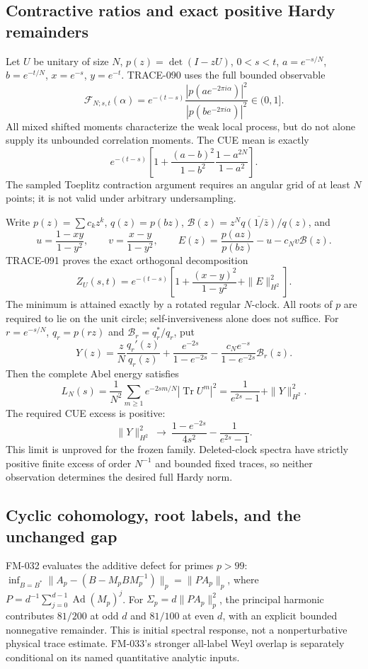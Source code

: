 \subsection{Contractive ratios and exact positive Hardy remainders}
Let $U$ be unitary of size $N$, $p(z)=\det(I-zU)$, $0<s<t$,
$a=e^{-s/N}$, $b=e^{-t/N}$, $x=e^{-s}$, $y=e^{-t}$.
TRACE-090 uses the full bounded observable
\[
 \mathcal F_{N;s,t}(\alpha)=e^{-(t-s)}
 \frac{|p(ae^{-2\pi i\alpha})|^2}{|p(be^{-2\pi i\alpha})|^2}
 \in(0,1].
\]
All mixed shifted moments characterize the weak local process, but do not
alone supply its unbounded correlation moments. The CUE mean is exactly
\[
 e^{-(t-s)}\left[1+\frac{(a-b)^2}{1-b^2}
                         \frac{1-a^{2N}}{1-a^2}\right].
\]
The sampled Toeplitz contraction argument requires an angular grid of
at least $N$ points; it is not valid under arbitrary undersampling.

Write $p(z)=\sum c_kz^k$, $q(z)=p(bz)$,
$\mathscr B(z)=z^N\overline{q(1/\bar z)}/q(z)$, and
\[
 u=\frac{1-xy}{1-y^2},\qquad v=\frac{x-y}{1-y^2},\qquad
 E(z)=\frac{p(az)}{p(bz)}-u-c_Nv\mathscr B(z).
\]
TRACE-091 proves the exact orthogonal decomposition
\[
 Z_U(s,t)=e^{-(t-s)}\left[1+\frac{(x-y)^2}{1-y^2}
                                      +\|E\|_{H^2}^2\right].
\]
The minimum is attained exactly by a rotated regular $N$-clock. All roots
of $p$ are required to lie on the unit circle; self-inversiveness alone
does not suffice. For $r=e^{-s/N}$, $q_r=p(rz)$ and
$\mathscr B_r=q_r^*/q_r$, put
\[
 Y(z)=\frac zN\frac{q_r'(z)}{q_r(z)}
       +\frac{e^{-2s}}{1-e^{-2s}}
       -\frac{c_Ne^{-s}}{1-e^{-2s}}\mathscr B_r(z).
\]
Then the complete Abel energy satisfies
\[
 L_N(s)=\frac1{N^2}\sum_{m\ge1}e^{-2sm/N}
                  |\operatorname{Tr}U^m|^2
       =\frac1{e^{2s}-1}+\|Y\|_{H^2}^2.
\]
The required CUE excess is positive:
\[
 \|Y\|_{H^2}^2\ \longrightarrow\
 \frac{1-e^{-2s}}{4s^2}-\frac1{e^{2s}-1}.
\]
This limit is unproved for the frozen family. Deleted-clock spectra have
strictly positive finite excess of order $N^{-1}$ and bounded fixed traces,
so neither observation determines the desired full Hardy norm.

\subsection{Cyclic cohomology, root labels, and the unchanged gap}
FM-032 evaluates the additive defect for primes $p>99$:
$\inf_{B=B^*}\|A_p-(B-M_pBM_p^{-1})\|_p=\|P A_p\|_p$,
where $P=d^{-1}\sum_{j=0}^{d-1}\operatorname{Ad}(M_p)^j$.
For $\Sigma_p=d\|PA_p\|_p^2$, the principal harmonic contributes
$81/200$ at odd $d$ and $81/100$ at even $d$, with an explicit bounded
nonnegative remainder. This is initial spectral response, not a
nonperturbative physical trace estimate. FM-033's stronger all-label Weyl
overlap is separately conditional on its named quantitative analytic inputs.

